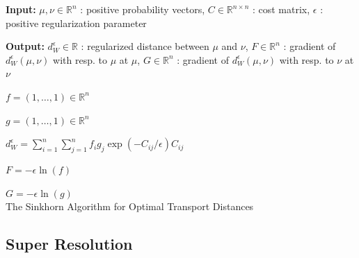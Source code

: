 \documentclass{beamer}
\newcommand{\R}{{\mathbb{R}}}
\begin{document}
\begin{frame}{}
\small

\textbf{Input:} 
$\mu, \nu \in \R^n$ : positive probability vectors,
$C\in\R^{n \times n}$ : cost matrix,
$\epsilon$ : positive regularization parameter

\pause
\textbf{Output:}
$d_W^\epsilon \in \R$ : regularized distance between $\mu$ and $\nu$,
$F \in \R^n$ : gradient of $d_W^\epsilon(\mu,\nu)$ with resp. to $\mu$ at $\mu$,
$G \in \R^n$ : gradient of $d_W^\epsilon(\mu,\nu)$ with resp. to $\nu$ at $\nu$
\pause

\hfill
\begin{minipage}{.74\textwidth}
\begin{algorithm}[H]
    

    $f = (1,\ldots,1)\in \R^n$
    
    $g = (1,\ldots,1)\in \R^n$
    
 	{
 	    \pause
  	}
  	\pause

    $d_W^\epsilon = \sum_{i=1}^n \sum_{j=1}^n f_i g_j \exp(-C_{ij} /\epsilon) C_{ij}$ 
  	
  	$F = -\epsilon \ln(f)$
  	
  	$G = -\epsilon \ln(g)$\\
  	
	\caption{ The Sinkhorn Algorithm for Optimal Transport Distances}
	\label{algo:Sinkhorn}
\end{algorithm}
\end{minipage}

\end{frame}

\subsection{Super Resolution}
\end{document}
